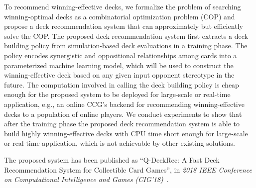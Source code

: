 To recommend winning-effective decks, we formalize the problem of searching winning-optimal decks as a combinatorial optimization problem (COP) and propose a deck recommendation system that can approximately but efficiently solve the COP. The proposed deck recommendation system first extracts a deck building policy from simulation-based deck evaluations in a training phase. The policy encodes synergistic and oppositional relationships among cards into a parameterized machine learning model, which will be used to construct the winning-effective deck based on any given input opponent stereotype in the future. The computation involved in calling the deck building policy is cheap enough for the proposed system to be deployed for large-scale or real-time application, e.g., an online CCG's backend for recommending winning-effective decks to a population of online players. We conduct experiments to show that after the training phase the proposed deck recommendation system is able to build highly winning-effective decks with CPU time short enough for large-scale or real-time application, which is not achievable by other existing solutions. 

The proposed system has been published as ``Q-DeckRec: A Fast Deck Recommendation System for Collectible Card Games'', in \textit{2018 IEEE Conference on Computational Intelligence and Games (CIG'18)}~\cite{chenqdeckrec}.



